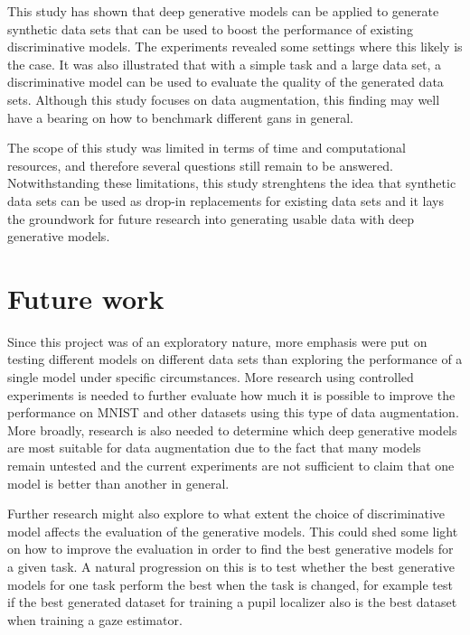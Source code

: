 This study has shown that deep generative models can be applied to generate synthetic data sets that can be used to boost the performance of existing discriminative models. The experiments revealed some settings where this likely is the case. It was also illustrated that with a simple task and a large data set, a discriminative model can be used to evaluate the quality of the generated data sets. Although this study focuses on data augmentation, this finding may well have a bearing on how to benchmark different \acrshort{gans} in general. 

The scope of this study was limited in terms of time and computational resources, and therefore several questions still remain to be answered. Notwithstanding these limitations, this study strenghtens the idea that synthetic data sets can be used as drop-in replacements for existing data sets and it lays the groundwork for future research into generating usable data with deep generative models.

\section{Future work}
Since this project was of an exploratory nature, more emphasis were put on testing different models on different data sets than exploring the performance of a single model under specific circumstances. More research using controlled experiments is needed to further evaluate how much it is possible to improve the performance on MNIST and other datasets using this type of data augmentation. More broadly, research is also needed to determine which deep generative models are most suitable for data augmentation due to the fact that many models remain untested and the current experiments are not sufficient to claim that one model is better than another in general.

Further research might also explore to what extent the choice of discriminative model affects the evaluation of the generative models. This could shed some light on how to improve the evaluation in order to find the best generative models for a given task. A natural progression on this is to test whether the best generative models for one task perform the best when the task is changed, for example test if the best generated dataset for training a pupil localizer also is the best dataset when training a gaze estimator.



